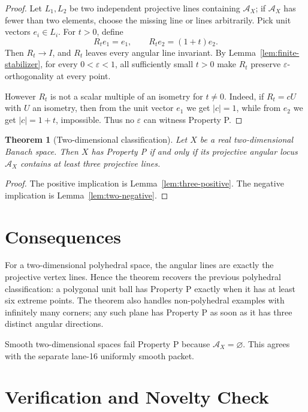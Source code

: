 \documentclass[11pt]{article}
\newtheorem{theorem}{Theorem}
\newcommand{\eps}{\varepsilon}
\newcommand{\cA}{\mathcal A}
\begin{document}
\begin{proof}
Let \(L_1,L_2\) be two independent projective lines containing \(\cA_X\); if
\(\cA_X\) has fewer than two elements, choose the missing line or lines
arbitrarily.  Pick unit vectors \(e_i\in L_i\).  For \(t>0\), define
\[
  R_t e_1=e_1,\qquad R_t e_2=(1+t)e_2.
\]
Then \(R_t\to I\), and \(R_t\) leaves every angular line invariant.  By
Lemma~\ref{lem:finite-stabilizer}, for every \(0<\eps<1\), all sufficiently
small \(t>0\) make \(R_t\) preserve \(\eps\)-orthogonality at every point.

However \(R_t\) is not a scalar multiple of an isometry for \(t\neq0\).  Indeed,
if \(R_t=cU\) with \(U\) an isometry, then from the unit vector \(e_1\) we get
\(|c|=1\), while from \(e_2\) we get \(|c|=1+t\), impossible.  Thus no
\(\eps\) can witness Property P.
\end{proof}

\begin{theorem}[Two-dimensional classification]
\label{thm:classification}
Let \(X\) be a real two-dimensional Banach space.  Then \(X\) has Property P if
and only if its projective angular locus \(\cA_X\) contains at least three
projective lines.
\end{theorem}

\begin{proof}
The positive implication is Lemma~\ref{lem:three-positive}.  The negative
implication is Lemma~\ref{lem:two-negative}.
\end{proof}

\section*{Consequences}

For a two-dimensional polyhedral space, the angular lines are exactly the
projective vertex lines.  Hence the theorem recovers the previous polyhedral
classification: a polygonal unit ball has Property P exactly when it has at
least six extreme points.  The theorem also handles non-polyhedral examples
with infinitely many corners; any such plane has Property P as soon as it has
three distinct angular directions.

Smooth two-dimensional spaces fail Property P because \(\cA_X=\varnothing\).
This agrees with the separate lane-16 uniformly smooth packet.

\section*{Verification and Novelty Check}
\end{document}
